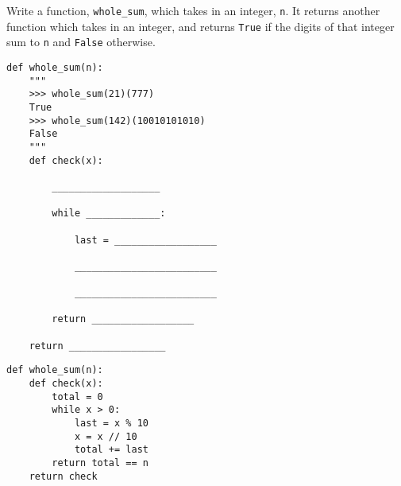 \begin{blocksection}
\question Write a function, \lstinline{whole_sum}, which takes in an integer, \lstinline{n}. It returns another function which takes in an integer, and returns \lstinline{True} if the digits of that integer sum to \lstinline{n} and \lstinline{False} otherwise.

\begin{lstlisting}
def whole_sum(n): 
    """ 
    >>> whole_sum(21)(777)
    True
    >>> whole_sum(142)(10010101010)
    False
    """
    def check(x):

        ___________________
		
        while _____________:
		
            last = __________________
				
            _________________________
				
            _________________________
				
        return __________________
		
    return _________________

\end{lstlisting}

\begin{solution}
\begin{lstlisting}
def whole_sum(n):
    def check(x):
        total = 0
        while x > 0:
            last = x % 10
            x = x // 10
            total += last
        return total == n
    return check
\end{lstlisting}
\end{solution}
\end{blocksection}
